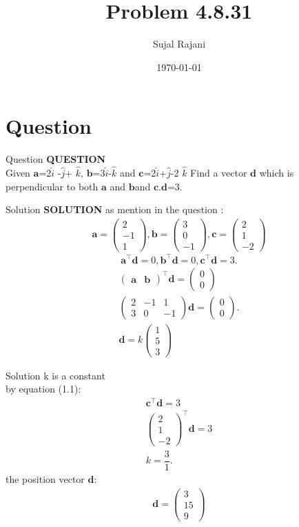 \documentclass{beamer}
\title{Problem 4.8.31}
\author{Sujal Rajani}
\date{\today}
\let\vec\mathbf
\theoremstyle{remark}
\newcommand{\myvec}[1]{\ensuremath{\begin{pmatrix}#1\end{pmatrix}}}
\numberwithin{equation}{section}
\begin{document}
\begin{frame}
\titlepage
\end{frame}

\section{Question}
\begin{frame}{Question}
\textbf{QUESTION}
\\
 Given $\vec{a}$=2$\hat{i}$ -$\hat{j}$+ $\hat{k}$, $\vec{b}$=3$\hat{i}$-$\hat{k}$ and $\vec{c}$=2$\hat{i}$+$\hat{j}$-2 $\hat{k}$ Find a vector  $\vec{d}$ which is perpendicular to both $\vec{a}$ and $\vec{b}$and $\vec{c}$.$\vec{d}$=3.
\end{frame}
\begin{frame}{Solution}
\textbf{SOLUTION}
as mention in the question :
\begin{align*}
\vec{a}=\myvec{2\\-1\\1},\vec{b}=\myvec{3\\0\\-1},\vec{c}=\myvec{2\\1\\-2}
\end{align*}
\begin{equation}
    \vec{a}^\top\vec{d}=0, \vec{b}^\top\vec{d}=0,  \vec{c}^\top\vec{d}=3.
\end{equation}
\begin{align*}
    \myvec{\vec{a}&\vec{b}}^\top\vec{d}=\myvec{0\\0}
    \\
    \myvec{2&-1&1\\3&0&-1}\vec{d}=\myvec{0\\0}.
    \\
    \vec{d}=k\myvec{1\\5\\3}
\end{align*}
 \end{frame}
\begin{frame}{Solution}
k is a constant 
\\
by equation (1.1):
\begin{align*}
\vec{c}^\top\vec{d}=3
\\
    \myvec{2\\1\\-2}^\top\vec{d}=3
    \\
    k=\dfrac{3}{1}.
\end{align*}
the position vector $\vec{d}$:
\begin{align*}
    \vec{d}=\myvec{3\\15\\9}
\end{align*}
     \end{frame}
\end{document}
